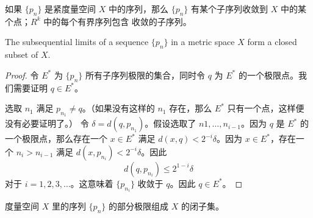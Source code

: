 \documentclass[../poma-notes.tex]{subfiles}
\begin{document}
\anote 如果 $\{p_n\}$ 是紧度量空间 $X$ 中的序列，那么 $\{p_n\}$ 有某个子序列收敛到 $X$ 中的某个点；$R^k$ 中的每个有界序列包含
收敛的子序列。

\begin{theorem}
  The subsequential limits of a sequence $\{p_n\}$ in a metric space $X$ form a closed subset of $X$.
\end{theorem}

\begin{proof}
  令 $E^*$ 为 $\{p_n\}$ 所有子序列极限的集合，同时令 $q$ 为 $E^*$ 的一个极限点。我们需要证明 $q \in E^*$。

  选取 $n_1$ 满足 $p_{n_1} \ne q$。（如果没有这样的 $n_1$ 存在，那么 $E^*$ 只有一个点，这样便没有必要证明了。）
  令 $\delta = d(q, p_{n_1})$。假设选取了 $n1, \dots, n_{i-1}$。因为 $q$ 是 $E^*$ 的一个极限点，那么存在一个 $x\in E^*$
  满足 $d(x,q) < 2^{-i} \delta$。因为 $x \in E^*$，存在一个 $n_i > n_{i-1}$ 满足 $d(x,p_{n_i}) < 2^{-i} \delta$。因此
  \[ d(q, p_{n_i}) \le 2^{1-i} \delta \]
  对于 $i = 1,2,3,\dots$。这意味着 $\{p_{n_i}\}$ 收敛于 $q$。因此 $q \in E^*$。
\end{proof}

\anote 度量空间 $X$ 里的序列 $\{p_n\}$ 的部分极限组成 $X$ 的闭子集。
\end{document}
